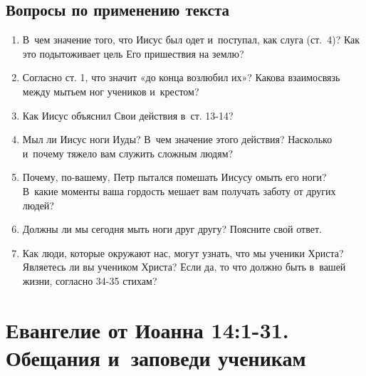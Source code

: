 \documentclass[a4paper,12pt]{article}
\begin{document}
\subsection*{Вопросы по применению текста} 
\begin{enumerate}
    \item В~чем значение того, что Иисус был одет и~поступал, как слуга (ст.~4)? Как это подытоживает цель Его пришествия на землю?
    
    \myline
    
    \myline
    \item Согласно ст. 1, что значит «до конца возлюбил их»? Какова взаимосвязь между мытьем ног учеников и~крестом? 
    
    \myline
    
    \myline
    \item Как Иисус объяснил Свои действия в~ст. 13-14? 
    
    \myline
    
    \myline
    \item Мыл ли Иисус ноги Иуды? В~чем значение этого действия? Насколько и~почему тяжело вам служить сложным людям? 
    
    \myline
    
    \myline
    \item Почему, по-вашему, Петр пытался помешать Иисусу омыть его ноги? В~какие моменты ваша гордость мешает вам получать заботу от других людей?
    
    \myline
    
    \myline
    \item Должны ли мы сегодня мыть ноги друг другу? Поясните свой ответ. 
    
    \myline
    
    \myline
    \item Как люди, которые окружают нас, могут узнать, что мы ученики Христа? Являетесь ли вы учеником Христа? Если да, то что должно быть в~вашей жизни, согласно 34-35 стихам? 
    
    \myline
    
    \myline
\end{enumerate}



\section{Евангелие от Иоанна 14:1-31. Обещания и~заповеди ученикам}
\end{document}
